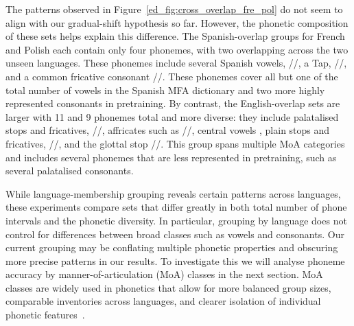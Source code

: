The patterns observed in Figure~\ref{ed_fig:cross_overlap_fre_pol} do not seem to align with our gradual-shift hypothesis so far. However, the phonetic composition of these sets helps explain this difference. The Spanish-overlap groups for French and Polish each contain only four phonemes, with two overlapping across the two unseen languages. These phonemes include several Spanish vowels, //, a Tap, //, and a common fricative consonant //. These phonemes cover all but one of the total number of vowels in the Spanish MFA dictionary and two more highly represented consonants in pretraining. By contrast, the English-overlap sets are larger with 11 and 9 phonemes total and more diverse: they include palatalised stops and fricatives, //, affricates such as //, central vowels , plain stops and fricatives, //, and the  glottal stop //. This group spans multiple MoA categories and includes several phonemes that are less represented in pretraining, such as several palatalised consonants. 


While language-membership grouping reveals certain patterns across languages, these experiments compare sets that differ greatly in both total number of phone intervals and the phonetic diversity. In particular, grouping by language does not control for differences between broad classes such as vowels and consonants. Our current grouping may be conflating multiple phonetic properties and obscuring more precise patterns in our results. To investigate this we will analyse phoneme accuracy by manner-of-articulation (MoA) classes in the next section. MoA classes are widely used in phonetics that allow for more balanced group sizes, comparable inventories across languages, and clearer isolation of individual phonetic features~\cite{international1999handbook}.



